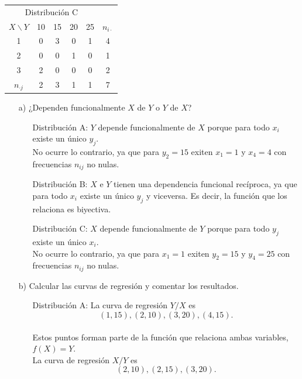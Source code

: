 \documentclass[10pt,a4paper]{article}
\begin{document}
\begin{enumerate}
\begin{center}
\begin{tabular}{c|ccc|c}
\end{tabular}
\begin{tabular}{c|cccc|c}
\multicolumn{5}{c}{Distribución C}\\
$X \backslash Y$ & 10 & 15 & 20 & 25 & $n_{i\cdot}$\\\hline
1 & 0 & 3 & 0 & 1 & 4 \\
2 & 0 & 0 & 1 & 0 & 1 \\
3 & 2 & 0 & 0 & 0 & 2 \\\hline
$n_{\cdot j}$ & 2 & 3 & 1 & 1 & 7 \\

\end{tabular}
\end{center}

\begin{itemize}

\item[a)]¿Dependen funcionalmente $X$ de $Y$ o $Y$ de $X$?

\begin{itemize}

\item[Distribución A:]$Y$ depende funcionalmente de $X$ porque para todo $x_i$ existe un único $y_j$.
\\No ocurre lo contrario, ya que para $y_2 = 15$ exiten $x_1 = 1$ y $x_4 = 4$ con frecuencias $n_{ij}$ no nulas.

\item[Distribución B:]$X$ e $Y$ tienen una dependencia funcional recíproca, ya que para todo $x_i$ existe un único $y_j$ y viceversa.
Es decir, la función que los relaciona es biyectiva.

\item[Distribución C:]$X$ depende funcionalmente de $Y$ porque para todo $y_j$ existe un único $x_i$.
\\No ocurre lo contrario, ya que para $x_1 = 1$ exiten $y_2 = 15$ y $y_4 = 25$ con frecuencias $n_{ij}$ no nulas.

\end{itemize}

\item[b)]Calcular las curvas de regresión y comentar los resultados.

\begin{itemize}

\item[Distribución A:]La curva de regresión $Y/X$ es $$(1, 15), (2, 10), (3, 20), (4, 15).$$
\\Estos puntos forman parte de la función que relaciona ambas variables, $f(X) = Y$.
\\La curva de regresión $X/Y$ es $$(2, 10), (2, 15), (3, 20).$$


\end{itemize}
\end{itemize}
\end{enumerate}
\end{document}
